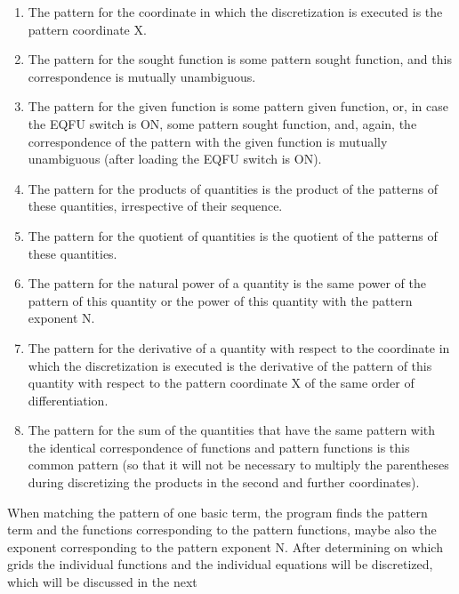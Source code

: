 \begin{enumerate}
  \item The  pattern for  the coordinate  in which  the discretization is
  executed is the pattern coordinate X.

  \item  The  pattern  for  the  sought  function  is some pattern sought
  function, and this correspondence is mutually unambiguous.

  \item  The  pattern  for  the  given  function  is  some  pattern given
  function, or,  in case  the EQFU  switch is  ON, some pattern sought
  function, and, again, the correspondence  of  the  pattern  with the
  given  function  is  mutually  unambiguous  (after  loading the EQFU
  switch is ON).

  \item The pattern for the products of quantities is the  product of the
  patterns of these quantities, irrespective of their sequence.

  \item The pattern for the quotient of quantities is the quotient of the
  patterns of these quantities.

  \item The pattern for the natural power of a quantity is the same power
  of the  pattern of  this quantity or the power of this quantity with
  the pattern exponent N.

  \item The pattern for the derivative of a quantity with  respect to the
  coordinate in which the discretization is executed is the derivative
  of  the  pattern  of  this  quantity  with  respect  to  the pattern
  coordinate X of the same order of differentiation.

  \item The  pattern for  the sum  of the  quantities that  have the same
  pattern with the identical  correspondence of  functions and pattern
  functions is  this common  pattern (so that it will not be necessary
  to multiply the parentheses during discretizing the products  in the
  second and further coordinates).
\end{enumerate}
When  matching  the  pattern  of  one  basic term, the program finds the
pattern term and the functions corresponding  to the  pattern functions,
maybe also  the exponent  corresponding to the pattern exponent N. After
determining on which grids the individual  functions and  the individual
equations  will  be  discretized,  which  will  be discussed in the next

